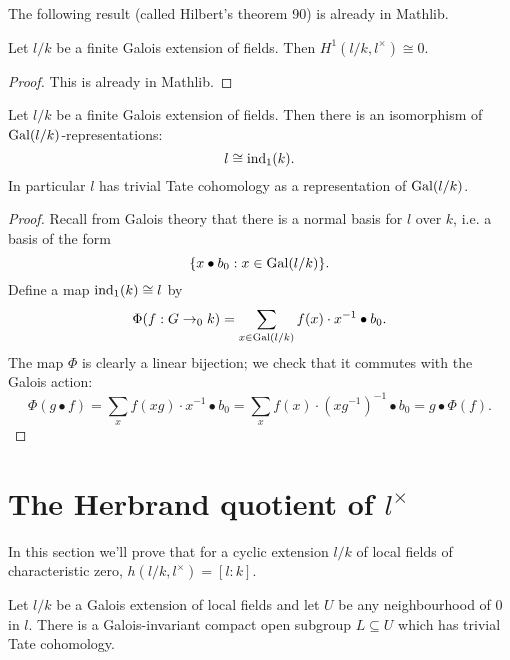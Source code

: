 The following result (called Hilbert's theorem 90) is already in Mathlib.

\begin{theorem}\label{thm:hilbert 90}
	\mathlibok
	Let $l/k$ be a finite Galois extension of fields.
	Then $H^1(l/k, l^\times) \cong 0$.
\end{theorem}

\begin{proof}
	\mathlibok
	This is already in Mathlib.
\end{proof}

\begin{theorem}\label{thm:additive field trivial}
	Let $l/k$ be a finite Galois extension of fields.
	Then there is an isomorphism of $\mathrm{Gal}(l/k)$-representations:
	\[
		l \cong \mathrm{ind}_1(k).
	\]
	In particular $l$ has trivial Tate cohomology as a representation of $\mathrm{Gal}(l/k)$.
\end{theorem}

\begin{proof}
	Recall from Galois theory that there is a normal basis for $l$ over $k$, i.e. a basis of the
	form
	\[
		\{x \bullet b_0 : x \in \mathrm{Gal}(l/k)\}.
	\]
	Define a map $\mathrm{ind}_1(k) \cong l$ by
	\[
		\Phi (f : G \to_0 k) = \sum_{x \in \mathrm{Gal}(l/k)} f(x) \cdot x^{-1} \bullet b_0.
	\]
	The map $\Phi$ is clearly a linear bijection;
	we check that it commutes with the Galois action:
	\[
		\Phi(g\bullet f)
		= \sum_x f(xg) \cdot x^{-1} \bullet b_0
		= \sum_x f(x) \cdot (xg^{-1})^{-1} \bullet b_0
		= g \bullet \Phi(f).
	\]
\end{proof}






\section{The Herbrand quotient of \texorpdfstring{$l^{\times}$}{l*}}

In this section we'll prove that for a cyclic extension $l/k$
of local fields of characteristic zero,
$h(l/k,l^\times) = [l:k]$.

\begin{lemma}
	\label{lem:exists additive trivial}
	Let $l/k$ be a Galois extension of local fields and
	let $U$ be any neighbourhood of $0$ in $l$.
	There is a Galois-invariant compact open subgroup $L \subseteq U$
	which has trivial Tate cohomology.
\end{lemma}

